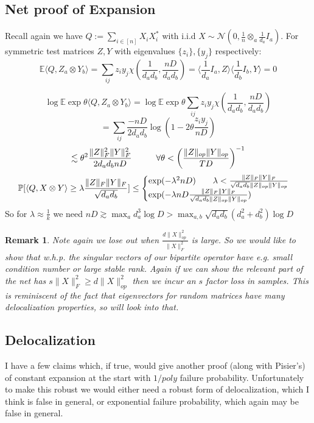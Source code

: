 \documentclass{article}
\newtheorem{remark}{Remark}
\newcommand{\E}{\mathbb{E}}
\renewcommand{\Pr}{\mathbb{P}}
\begin{document}
\subsection{Net proof of Expansion}
Recall again we have $Q := \sum_{i \in [n]} X_{i} X_{i}^{*}$ with i.i.d $X \sim \mathcal{N}(0,\frac{1}{n} \otimes_{a} \frac{1}{d_{a}} I_{a})$. For symmetric test matrices $Z,Y$ with eigenvalues $\{z_{i}\},\{y_{j}\}$ respectively:
\[ \E \langle Q, Z_{a} \otimes Y_{b} \rangle = \sum_{ij} z_{i} y_{j} \chi(\frac{1}{d_{a} d_{b}}, \frac{nD}{d_{a} d_{b}}) = \langle \frac{1}{d_{a}} I_{a}, Z \rangle \langle \frac{1}{d_{b}} I_{b}, Y \rangle = 0 \]

\[ \log \E \exp \theta \langle Q, Z_{a} \otimes Y_{b} \rangle = \log \E \exp \theta \sum_{ij} z_{i} y_{j} \chi(\frac{1}{d_{a} d_{b}}, \frac{nD}{d_{a} d_{b}})  \]
\[ = \sum_{ij} \frac{-nD}{2 d_{a} d_{b}} \log \left( 1 - 2 \theta \frac{z_{i} y_{j}}{nD} \right)   \]
\[ \lesssim \theta^{2} \frac{\|Z\|_{F}^{2} \|Y\|_{F}^{2}}{2 d_{a} d_{b} nD} \hspace{10mm} \forall \theta < \left( \frac{\|Z\|_{op} \|Y\|_{op}}{TD} \right)^{-1}  \]
\[ \Pr[ \langle Q, X \otimes Y \rangle \geq \lambda \frac{\|Z\|_{F} \|Y\|_{F}}{\sqrt{d_{a} d_{b}}} ] \leq
\begin{cases}
\exp( - \lambda^{2} nD ) \hspace{7mm} \lambda  < \frac{\|Z\|_{F} \|Y\|_{F}}{\sqrt{d_{a} d_{b}} \|Z\|_{op} \|Y\|_{op}}
\\ \exp ( - \lambda nD \frac{\|Z\|_{F} \|Y\|_{F}}{ \sqrt{d_{a} d_{b}} \|Z\|_{op} \|Y\|_{op}} )
\end{cases}
\]
So for $\lambda \approx \frac{1}{k}$ we need $nD \gtrsim \max_{a} d_{a}^{3} \log D > \max_{a,b} \sqrt{d_{a} d_{b}} (d_{a}^{2} + d_{b}^{2}) \log D$

\begin{remark}
Note again we lose out when $\frac{d \|X\|_{op}^{2}}{\|X\|_{F}^{2}}$ is large. So we would like to show that w.h.p. the singular vectors of our bipartite operator have e.g. small condition number or large stable rank. Again if we can show the relevant part of the net has $s \|X\|_{F}^{2} \geq d \|X\|_{op}^{2}$ then we incur an $s$ factor loss in samples. This is reminiscent of the fact that eigenvectors for random matrices have many delocalization properties, so will look into that.
\end{remark}

\subsection{Delocalization}
I have a few claims which, if true, would give another proof (along with Pisier's) of constant expansion at the start with $1/poly$ failure probability. Unfortunately to make this robust we would either need a robust form of delocalization, which I think is false in general, or exponential failure probability, which again may be false in general.
\end{document}
